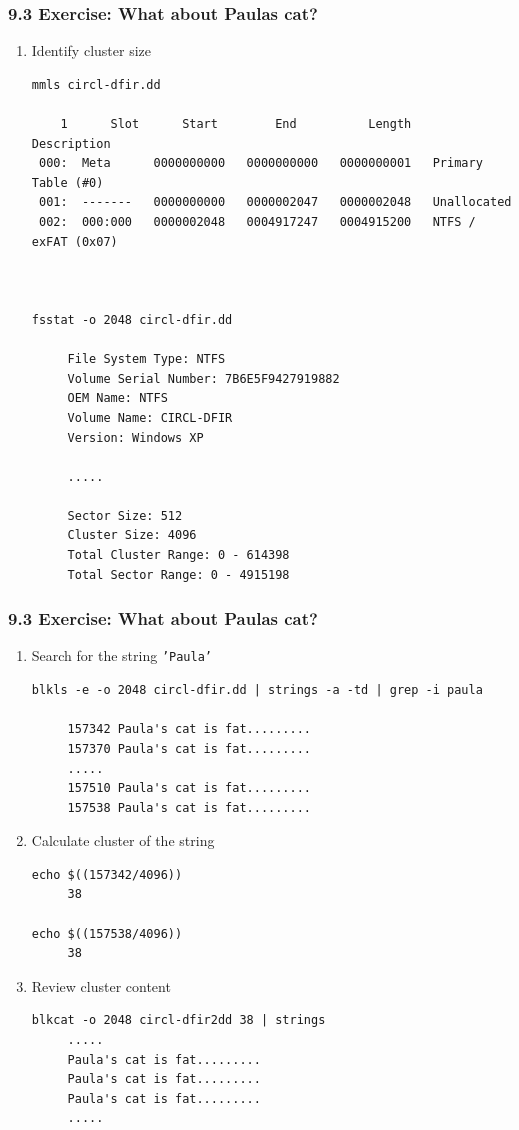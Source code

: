 \begin{frame}[fragile]
  \frametitle{9.3 Exercise: What about Paulas cat?}
    \begin{enumerate}
        \item Identify cluster size
        \begin{lstlisting}[basicstyle=\tiny]
mmls circl-dfir.dd

    1      Slot      Start        End          Length       Description
 000:  Meta      0000000000   0000000000   0000000001   Primary Table (#0)
 001:  -------   0000000000   0000002047   0000002048   Unallocated
 002:  000:000   0000002048   0004917247   0004915200   NTFS / exFAT (0x07)



fsstat -o 2048 circl-dfir.dd

     File System Type: NTFS
     Volume Serial Number: 7B6E5F9427919882
     OEM Name: NTFS    
     Volume Name: CIRCL-DFIR
     Version: Windows XP

     .....

     Sector Size: 512
     Cluster Size: 4096
     Total Cluster Range: 0 - 614398
     Total Sector Range: 0 - 4915198
        \end{lstlisting}
    \seti
    \end{enumerate}
\end{frame}


\begin{frame}[fragile]
  \frametitle{9.3 Exercise: What about Paulas cat?}
    \begin{enumerate}
        \conti
        \item Search for the string \texttt{'Paula'}
        \begin{lstlisting}[basicstyle=\tiny]
blkls -e -o 2048 circl-dfir.dd | strings -a -td | grep -i paula

     157342 Paula's cat is fat.........
     157370 Paula's cat is fat.........
     .....
     157510 Paula's cat is fat.........
     157538 Paula's cat is fat.........
        \end{lstlisting}

        \item Calculate cluster of the string
        \begin{lstlisting}[basicstyle=\tiny]
echo $((157342/4096))
     38

echo $((157538/4096))
     38
        \end{lstlisting}

        \item Review cluster content
        \begin{lstlisting}[basicstyle=\tiny]
blkcat -o 2048 circl-dfir2dd 38 | strings
     .....
     Paula's cat is fat.........
     Paula's cat is fat.........
     Paula's cat is fat.........
     .....
        \end{lstlisting}
    \seti
    \end{enumerate}
\end{frame}


